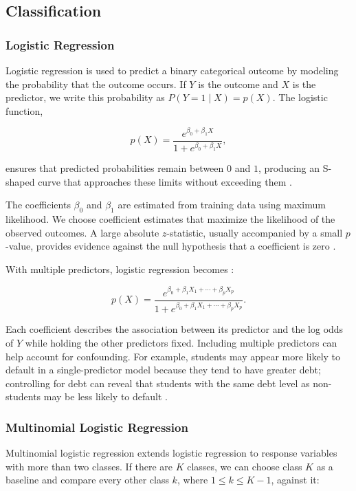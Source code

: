 \documentclass[11pt,letterpaper,reqno]{amsart}
\numberwithin{equation}{subsection}
\theoremstyle{definition}
\numberwithin{thm}{subsection}
\begin{document}
\subsection{Classification}

\subsubsection{Logistic Regression}

Logistic regression is used to predict a binary categorical outcome by modeling the probability that the outcome occurs. If $Y$ is the outcome and $X$ is the predictor, we write this probability as $P(Y=1\mid X)=p(X)$. The logistic function,

\[
p(X)=\frac{e^{\beta_0+\beta_1X}}{1+e^{\beta_0+\beta_1X}},
\]

ensures that predicted probabilities remain between $0$ and $1$, producing an S-shaped curve that approaches these limits without exceeding them \cite[Equation 4.2, p. 139]{James:2023}.

The coefficients $\beta_0$ and $\beta_1$ are estimated from training data using maximum likelihood. We choose coefficient estimates that maximize the likelihood of the observed outcomes. A large absolute $z$-statistic, usually accompanied by a small $p$-value, provides evidence against the null hypothesis that a coefficient is zero \cite[Sections 4.3.2--4.3.3, pp. 140--142]{James:2023}.

With multiple predictors, logistic regression becomes \cite[Equation 4.7, p. 142]{James:2023}:

\[
p(X)=
\frac{e^{\beta_0+\beta_1X_1+\cdots+\beta_pX_p}}
{1+e^{\beta_0+\beta_1X_1+\cdots+\beta_pX_p}}.
\]

Each coefficient describes the association between its predictor and the log odds of $Y$ while holding the other predictors fixed. Including multiple predictors can help account for confounding. For example, students may appear more likely to default in a single-predictor model because they tend to have greater debt; controlling for debt can reveal that students with the same debt level as non-students may be less likely to default \cite[Section 4.3.4, pp. 142--144]{James:2023}.

\subsubsection{Multinomial Logistic Regression}

Multinomial logistic regression extends logistic regression to response variables with more than two classes. If there are $K$ classes, we can choose class $K$ as a baseline and compare every other class $k$, where $1\leq k\leq K-1$, against it:
\end{document}
